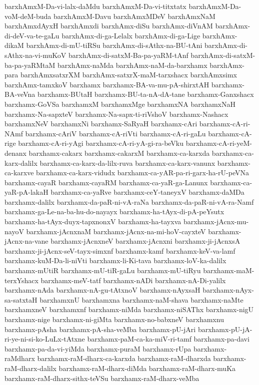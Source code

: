 {barxhAmxM-Da-vi-lalx-daMdu
barxhAmxM-Da-vi-titxtatx
barxhAmxM-Da-voM-deM-buda
barxhAmxM-Davu
barxhAmxMDeV
barxhAmxNaM
barxhAmxdAyxH
barxhAmxdi
barxhAmx-diSu
barxhAmx-diVnAM
barxhAmx-di-deV-va-te-gaLu
barxhAmx-di-ga-Lelalx
barxhAmx-di-ga-Lige
barxhAmx-dikaM
barxhAmx-di-mU-tiRSu
barxhAmx-di-sAthx-na-BU-tAni
barxhAmx-di-sAthx-na-vi-muKoV
barxhAmx-di-satxM-Ba-pa-yaRM-tAnf
barxhAmx-di-satxM-ba-pa-yaRMtaM
barxhAmx-naMda
barxhAmx-naM-da-barxhamx
barxhAmx-para
barxhAmxsatxrXM
barxhAmx-satxrX-maM-tarxshacx
barxhAmxsimx
barxhAmx-tamxkoV
barxhamx
barxhamx-BA-va-mu-pA-shirxtAH
barxhamx-BA-veVna
barxhamx-BUtaH
barxhamx-BU-ta-nA-dA-tane
barxhamx-Ganxshacx
barxhamx-GoVSa
barxhamxM
barxhamxMge
barxhamxNA
barxhamxNaH
barxhamx-Na-sapxteV
barxhamx-Na-sapx-ti-riVshoV
barxhamx-Nashacx
barxhamxNeV
barxhamxNi
barxhamx-SaRyaH
barxhamx-cAri
barxhamx-cA-ri-NAmf
barxhamx-cAriV
barxhamx-cA-riVti
barxhamx-cA-ri-gaLu
barxhamx-cA-rige
barxhamx-cA-ri-yAgi
barxhamx-cA-ri-yA-gi-ra-beVku
barxhamx-cA-ri-yeM-denanx
barxhamx-cakarx
barxhamx-cakarxM
barxhamx-ca-karxda
barxhamx-ca-karx-dalilx
barxhamx-ca-karx-da-lilx-ruva
barxhamx-ca-karx-vanunx
barxhamx-ca-karxve
barxhamx-ca-karx-vidudx
barxhamx-ca-yAR-pa-ri-garx-ha-rU-peVNa
barxhamx-cayaR
barxhamx-cayaRM
barxhamx-ca-yaR-ga-Lanunx
barxhamx-ca-yaR-pA-lakaH
barxhamx-ca-yaRve
barxhamx-ceY-taneyxV
barxhamx-daMDa
barxhamx-dalilx
barxhamx-da-paR-ni-vA-raNa
barxhamx-da-paR-ni-vA-ra-Namf
barxhamx-ga-Le-na-ba-hu-do-nayayx
barxhamx-ha-tAyx-di-pA-peYsutx
barxhamx-ha-tAyx-duyx-tapxnonxV
barxhamx-ha-tayxva
barxhamx-jAcnx-mu-nayoV
barxhamx-jAcnxnaM
barxhamx-jAcnx-na-mi-hoV-cayxteV
barxhamx-jAcnx-na-vane
barxhamx-jAcnxneV
barxhamx-jAcnxni
barxhamx-ji-jAcnxsA
barxhamx-ji-jAcnx-seV-tayx-simxnf
barxhamx-kamf
barxhamx-keV-va-lamf
barxhamx-kuM-Da-li-niVti
barxhamx-li-Ki-tava
barxhamx-loV-ka-dalilx
barxhamx-mUtiR
barxhamx-mU-tiR-gaLu
barxhamx-mU-tiRyu
barxhamx-maM-terxYshacx
barxhamx-meV-tatf
barxhamx-nADi
barxhamx-nA-Di-yalilx
barxhamx-nAda
barxhamx-nA-gu-tAtxnoV
barxhamx-nAyxsaH
barxhamx-nAyx-sa-satxtaH
barxhamxnU
barxhamxna
barxhamx-naM-shava
barxhamx-naMte
barxhamxneV
barxhamxnf
barxhamx-niMda
barxhamx-niSAThx
barxhamx-nigU
barxhamx-nige
barxhamx-ni-giMta
barxhamx-no-babxneV
barxhamxnu
barxhamx-pAsha
barxhamx-pA-sha-veMba
barxhamx-pU-jAri
barxhamx-pU-jA-ri-ye-ni-si-ko-LuLx-tAtxne
barxhamx-paM-ca-ka-miV-ri-tamf
barxhamx-pa-davi
barxhamx-pa-da-vi-yiMda
barxhamx-puraM
barxhamx-rUpa
barxhamx-raMdharx
barxhamx-raM-dharx-ca-karxda
barxhamx-raM-dharxda
barxhamx-raM-dharx-dalilx
barxhamx-raM-dharx-diMda
barxhamx-raM-dharx-muKa
barxhamx-raM-dharx-sithx-teVSu
barxhamx-raM-dharx-veMba
}
